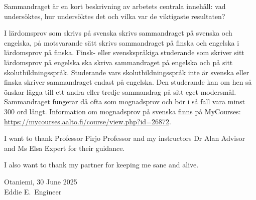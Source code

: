 \documentclass[english, 12pt, a4paper, elec, utf8, a-2b, online]{aaltothesis}
\begin{document}
\begin{abstractpage}[swedish]
Sammandraget är en kort beskrivning av arbetets centrala innehåll: vad 
undersöktes, hur undersöktes det och vilka var de viktigaste resultaten?

I lärdomsprov som skrivs på svenska skrivs sammandraget på svenska och engelska, 
på motsvarande sätt skrivs sammandraget på finska och engelska i lärdomsprov på 
finska. Finsk- eller svenskspråkiga studerande som skriver sitt lärdomsprov på 
engelska ska skriva sammandraget på engelska och på sitt skolutbildningsspråk. 
Studerande vars skolutbildningsspråk inte är svenska eller finska skriver 
sammandraget endast på engelska. Den studerande kan om hen så önskar lägga till 
ett andra eller tredje sammandrag på sitt eget modersmål. Sammandraget fungerar 
då ofta som mognadsprov och bör i så fall vara minst 300 ord långt. Information 
om mognadsprov på svenska finns på MyCourses:\\
\url{https://mycourses.aalto.fi/course/view.php?id=26872}.
\end{abstractpage}


\dothesispagenumbering{}

I want to thank Professor Pirjo Professor and my instructors Dr Alan Advisor and
Ms Elsa Expert for their guidance.

I also want to thank my partner for keeping me sane and alive.

\vspace{5cm}
Otaniemi, 30 June 2025\\

\vspace{5mm}
{\hfill Eddie E.\ Engineer \hspace{1cm}}

\newpage


\thesistableofcontents
\end{document}
